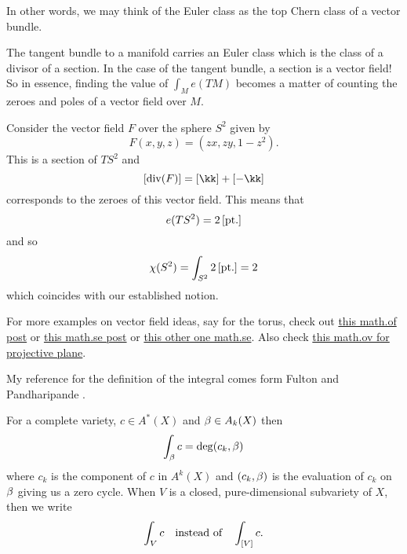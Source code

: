 \documentclass[12pt]{memoir}
\begin{document}
\begin{Rmk}
In other words, we may think of the Euler class as the top Chern class of a vector bundle.
\end{Rmk}

\begin{Ex}
    The tangent bundle to a manifold carries an Euler class which is the class of a divisor of a section. In the case of the tangent bundle, a section is a vector field! So in essence, finding the value of $\int_Me(TM)$ becomes a matter of counting the zeroes and poles of a vector field over $M$.
\end{Ex}

\begin{Ex}
    Consider the vector field $F$ over the sphere $S^2$ given by 
    $$F(x,y,z)=(zx,zy,1-z^2).$$
    This is a section of $TS^2$ and 
    $$\bonj{\div(F)}=\bonj{\kk}+\bonj{-\kk}$$
    corresponds to the zeroes of this vector field. This means that 
    $$e(TS^2)=2\left\lbrack\text{pt.}\right\rbrack$$
    and so 
    $$\chi(S^2)=\int_{S^2}2\left\lbrack\text{pt.}\right\rbrack=2$$
    which coincides with our established notion.
\end{Ex}

\begin{Rmk}
    For more examples on vector field ideas, say for the torus, check out \href{https://mathoverflow.net/questions/153961/constructing-a-vector-field-with-given-zeros-on-a-torus}{this math.of post} or \href{https://math.stackexchange.com/questions/213901/vector-fields-on-torus}{this math.se post} or \href{https://math.stackexchange.com/questions/3604214/non-vanishing-vector-fields-on-the-2-torus}{this other one math.se}. Also check \href{https://mathoverflow.net/questions/97449/computing-the-euler-characteristic-of-the-complex-projective-plane-using-differe}{this math.ov for projective plane}.
\end{Rmk}

My reference for the definition of the integral comes form Fulton and Pandharipande \cite{FPNotes}.

\begin{Def}
    For a complete variety, $c\in A^\ast(X)$ and $\beta\in A_k(X)$ then 
    $$\int_\beta c=\deg(c_k,\beta)$$
    where $c_k$ is the component of $c$ in $A^k(X)$ and $(c_k,\beta)$ is the evaluation of $c_k$ on $\beta$ giving us a zero cycle. When $V$ is a closed, pure-dimensional subvariety of $X$, then we write 
    $$\int_V c\quad\text{instead of}\quad\int_{\left\lbrack V\right\rbrack}c.$$
\end{Def}
\end{document}
